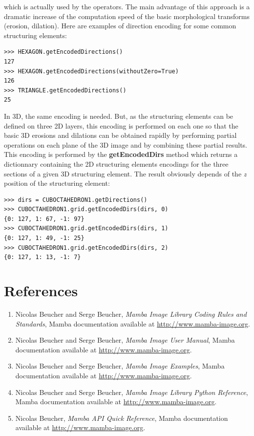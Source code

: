 \documentclass[a4paper,10pt,oneside]{article}
\begin{document}
which is actually used by the operators. The main advantage of this approach is a dramatic increase of the computation speed of the basic
morphological transforms (erosion, dilation). Here are examples of direction encoding for some common structuring elements:

\lstset{language=Python}
\begin{lstlisting}
>>> HEXAGON.getEncodedDirections()
127
>>> HEXAGON.getEncodedDirections(withoutZero=True)
126
>>> TRIANGLE.getEncodedDirections()
25
\end{lstlisting}

In 3D, the same encoding is needed. But, as the structuring elements can be defined on three 2D layers, this encoding is performed on each
one so that the basic 3D erosions and dilations can be obtained rapidly by performing partial operations on each plane of the 3D image and by
combining these partial results. This encoding is performed by the \textbf{getEncodedDirs} method which returns a dictionnary containing the 2D
structuring elements encodings for the three sections of a given 3D structuring element. The result obviously depends of the \emph{z} position of the
structuring element:

\lstset{language=Python}
\begin{lstlisting}
>>> dirs = CUBOCTAHEDRON1.getDirections()
>>> CUBOCTAHEDRON1.grid.getEncodedDirs(dirs, 0)
{0: 127, 1: 67, -1: 97}
>>> CUBOCTAHEDRON1.grid.getEncodedDirs(dirs, 1)
{0: 127, 1: 49, -1: 25}
>>> CUBOCTAHEDRON1.grid.getEncodedDirs(dirs, 2)
{0: 127, 1: 13, -1: 7}
\end{lstlisting}

\section{References}
\begin{enumerate}
\setcounter{enumi}{0}
\item \label{art:MILCRSman} Nicolas Beucher and Serge Beucher,
\emph{Mamba Image Library Coding Rules and Standards},
Mamba documentation available at \url{http://www.mamba-image.org}.
\item \label{art:MIUman} Nicolas Beucher and Serge Beucher,
\emph{Mamba Image User Manual},
Mamba documentation available at \url{http://www.mamba-image.org}.
\item \label{art:MIEman} Nicolas Beucher and Serge Beucher,
\emph{Mamba Image Examples},
Mamba documentation available at \url{http://www.mamba-image.org}.
\item \label{art:MILPRman} Nicolas Beucher and Serge Beucher,
\emph{Mamba Image Library Python Reference},
Mamba documentation available at \url{http://www.mamba-image.org}.
\item \label{art:MQRman} Nicolas Beucher,
\emph{Mamba API Quick Reference},
Mamba documentation available at \url{http://www.mamba-image.org}.
\end{enumerate}
\end{document}
